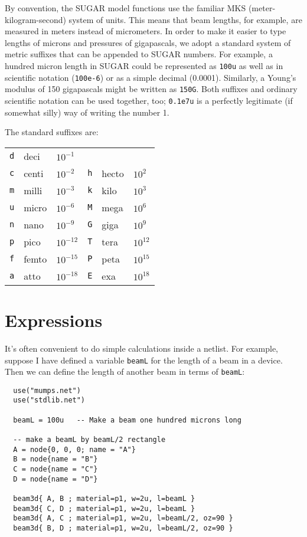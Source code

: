By convention, the SUGAR model functions use the familiar MKS
(meter-kilogram-second) system of units.  This means that beam lengths, for
example, are measured in meters instead of micrometers.  In order to make it
easier to type lengths of microns and pressures of gigapascals, we adopt a
standard system of metric suffixes that can be appended to SUGAR numbers.  For
example, a hundred micron length in SUGAR could be represented as \texttt{100u}
as well as in scientific notation (\texttt{100e-6}) or as a simple decimal
(0.0001).  Similarly, a Young's modulus of 150 gigapascals might be written as
\texttt{150G}.  Both suffixes and ordinary scientific notation can be used
together, too; \texttt{0.1e7u} is a perfectly legitimate (if somewhat silly)
way of writing the number 1.

The standard suffixes are:
\begin{center}
\begin{tabular}{|l|ll||l|ll|}
\hline
  \texttt{d} & deci  & $10^{-1}$  &              &       &          \\
  \texttt{c} & centi & $10^{-2}$  &   \texttt{h} & hecto & $10^2$   \\
  \texttt{m} & milli & $10^{-3}$  &   \texttt{k} & kilo  & $10^3$   \\
  \texttt{u} & micro & $10^{-6}$  &   \texttt{M} & mega  & $10^6$   \\
  \texttt{n} & nano  & $10^{-9}$  &   \texttt{G} & giga  & $10^9$   \\
  \texttt{p} & pico  & $10^{-12}$ &   \texttt{T} & tera  & $10^{12}$  \\
  \texttt{f} & femto & $10^{-15}$ &   \texttt{P} & peta  & $10^{15}$  \\
  \texttt{a} & atto  & $10^{-18}$ &   \texttt{E} & exa   & $10^{18}$  \\
\hline
\end{tabular}
\end{center}


\section{Expressions}

It's often convenient to do simple calculations inside a netlist.
For example, suppose I have defined a variable \texttt{beamL} for
the length of a beam in a device.  Then we can define the length
of another beam in terms of \texttt{beamL}:
\begin{verbatim}
  use("mumps.net")
  use("stdlib.net")

  beamL = 100u   -- Make a beam one hundred microns long

  -- make a beamL by beamL/2 rectangle
  A = node{0, 0, 0; name = "A"}
  B = node{name = "B"}
  C = node{name = "C"}
  D = node{name = "D"}
  
  beam3d{ A, B ; material=p1, w=2u, l=beamL }
  beam3d{ C, D ; material=p1, w=2u, l=beamL }
  beam3d{ A, C ; material=p1, w=2u, l=beamL/2, oz=90 }
  beam3d{ B, D ; material=p1, w=2u, l=beamL/2, oz=90 }
\end{verbatim}

